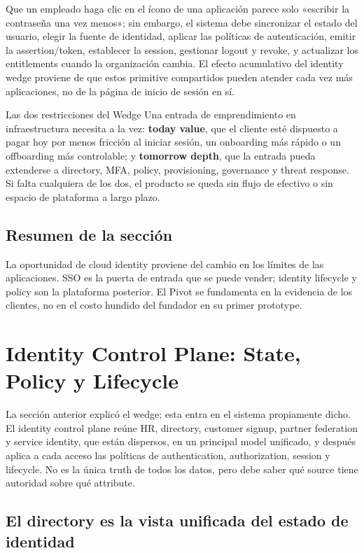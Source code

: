 \documentclass[a4paper]{article}
\begin{document}
Que un empleado haga clic en el ícono de una aplicación parece solo «escribir la contraseña una vez menos»; sin embargo, el sistema debe sincronizar el estado del usuario, elegir la fuente de identidad, aplicar las políticas de autenticación, emitir la assertion/token, establecer la session, gestionar logout y revoke, y actualizar los entitlements cuando la organización cambia. El efecto acumulativo del identity wedge proviene de que estos primitive compartidos pueden atender cada vez más aplicaciones, no de la página de inicio de sesión en sí.

\begin{importantbox}{Las dos restricciones del Wedge}
Una entrada de emprendimiento en infraestructura necesita a la vez: \textbf{today value}, que el cliente esté dispuesto a pagar hoy por menos fricción al iniciar sesión, un onboarding más rápido o un offboarding más controlable; y \textbf{tomorrow depth}, que la entrada pueda extenderse a directory, MFA, policy, provisioning, governance y threat response. Si falta cualquiera de los dos, el producto se queda sin flujo de efectivo o sin espacio de plataforma a largo plazo.
\end{importantbox}

\subsection{Resumen de la sección}

La oportunidad de cloud identity proviene del cambio en los límites de las aplicaciones. SSO es la puerta de entrada que se puede vender; identity lifecycle y policy son la plataforma posterior. El Pivot se fundamenta en la evidencia de los clientes, no en el costo hundido del fundador en su primer prototype.
\section{Identity Control Plane: State, Policy y Lifecycle}

La sección anterior explicó el wedge; esta entra en el sistema propiamente dicho. El identity control plane reúne HR, directory, customer signup, partner federation y service identity, que están dispersos, en un principal model unificado, y después aplica a cada acceso las políticas de authentication, authorization, session y lifecycle. No es la única truth de todos los datos, pero debe saber qué source tiene autoridad sobre qué attribute.

\subsection{El directory es la vista unificada del estado de identidad}
\end{document}
